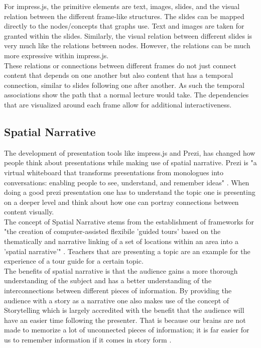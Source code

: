 \documentclass[twoside, 12pt]{article}
\begin{document}
For impress.js, the primitive elements are text, images, slides, and the visual relation between the different frame-like structures. The slides can be mapped directly to the nodes/concepts that graphs use. Text and images are taken for granted within the slides. Similarly, the visual relation between different slides is very much like the relations between nodes. However, the relations can be much more expressive within impress.js.\\

These relations or connections between different frames do not just connect content that depends on one another but also content that has a temporal connection, similar to slides following one after another. As such the temporal associations show the path that a normal lecture would take. The dependencies that are visualized around each frame allow for additional interactiveness.\\

\subsection{Spatial Narrative}
\label{sec:spatialnarrative}

The development of presentation tools like impress.js and Prezi, has changed how people think about presentations while making use of spatial narrative. Prezi is "a virtual whiteboard that transforms presentations from monologues into conversations: enabling people to see, understand, and remember ideas" \cite{Prezi:npentrel14}. When doing a good prezi presentation one has to understand the topic one is presenting on a deeper level and think about how one can portray connections between content visually.\\

The concept of Spatial Narrative stems from the establishment of frameworks for "the creation of computer-assisted flexibile 'guided tours' based on the thematically and narrative linking of a set of locations within an area into a 'spatial narrative'" \cite{SpatialNarratives:npentrel14}. Teachers that are presenting a topic are an example for the experience of a tour guide for a certain topic.\\

The benefits of spatial narrative is that the audience gains a more thorough understanding of the subject and has a better understanding of the interconnections between different pieces of information. By providing the audience with a story as a narrative one also makes use of the concept of Storytelling which is largely accredited with the benefit that the audience will have an easier time following the presenter. That is because our brains are not made to memorize a lot of unconnected pieces of information; it is far easier for us to remember information if it comes in story form \cite{Storytelling:npentrel14}.\\
\end{document}

